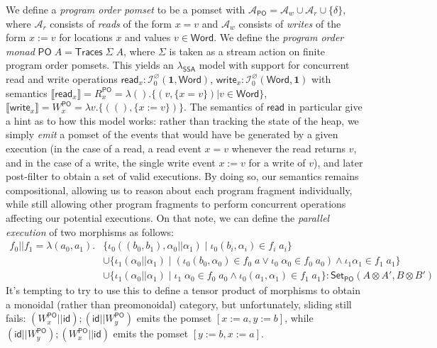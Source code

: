 \documentclass[acmsmall,screen,review]{acmart}
\newcommand{\mc}[1]{\ensuremath{\mathcal{#1}}}
\newcommand{\mb}[1]{\ensuremath{\mathbf{#1}}}
\newcommand{\ms}[1]{\ensuremath{\mathsf{#1}}}
\newcommand{\dnt}[1]{\llbracket{#1}\rrbracket}
\newcommand{\isotopessa}{\(\lambda_{\ms{SSA}}\)}
\begin{document}
We define a \emph{program order pomset} to be a pomset with \(\mc{A}_{\ms{PO}} = \mc{A}_w \cup
\mc{A}_r \cup \{\delta\}\), where \(\mc{A}_r\) consists of \textit{reads} of the form \(x = v\) and
\(\mc{A}_w\) consists of \textit{writes} of the form \(x := v\) for locations \(x\) and values \(v
\in \ms{Word}\). We define the \emph{program order monad} \(\ms{PO}\;A = \ms{Traces}\;\Sigma\;A\),
where \(\Sigma\) is taken as a stream action on finite program order pomsets. This yields an
\isotopessa{} model with support for concurrent read and write operations \(\ms{read}_x:
\mc{I}^\varnothing_0(\mb{1}, \ms{Word})\), \(\ms{write}_x: \mc{I}^\varnothing_0(\ms{Word}, \mb{1})\)
with semantics
\(
  \dnt{\ms{read}_x} = R_x^{\ms{PO}} = \lambda (). \{(v, \{x = v\}) | v \in \ms{Word}\}
\),
\(
  \dnt{\ms{write}_x} = W_x^{\ms{PO}} =  \lambda v. \{((), \{x := v\})\}
\).
The semantics of \(\ms{read}\) in particular give a hint as to how this model works: rather than
tracking the state of the heap, we simply \textit{emit} a pomset of the events that would have be
generated by a given execution (in the case of a read, a read event \(x = v\) whenever the read
returns \(v\), and in the case of a write, the single write event \(x := v\) for a write of \(v\)),
and later post-filter to obtain a set of valid executions. By doing so, our semantics remains
compositional, allowing us to reason about each program fragment individually, while still allowing
other program fragments to perform concurrent operations affecting our potential executions. On that
note, we can define the \textit{parallel execution} of two morphisms as follows:
\begin{equation}
  \begin{aligned}
  f_0 || f_1 = \lambda (a_0, a_1). 
  & \{\iota_0 ((b_0, b_1), \alpha_0 || \alpha_1) 
    \mid \iota_0 (b_i, \alpha_i) \in f_i\;a_i\} 
  \\ & \cup \{\iota_1 (\alpha_0 || \alpha_1) 
      \mid (\iota_0 (b_0, \alpha_0) \in f_0\;a \lor \iota_0\;\alpha_0 \in f_0\;a_0) 
      \land \iota_1 \alpha_1 \in f_1\;a_1\} 
  \\ & \cup \{\iota_1 (\alpha_0 || \alpha_1) 
      \mid \iota_1\;\alpha_0 \in f_0\;a_0 
      \land \iota_0 (a_1, \alpha_1) \in f_1\;a_1\}
    : \ms{Set}_{\ms{PO}}(A \otimes A', B \otimes B')
  \end{aligned}
\end{equation}
It's tempting to try to use this to define a tensor product of morphisms to obtain a monoidal
(rather than preomonoidal) category, but unfortunately, sliding still fails: \((W_x^{\ms{PO}} ||
\ms{id}) ; (\ms{id} || W_y^{\ms{PO}})\) emits the pomset \([x := a, y := b]\), while \((\ms{id} ||
W_y^{\ms{PO}}) ; (W_x^{\ms{PO}} || \ms{id})\) emits the pomset \([y := b, x := a]\). 
\end{document}
